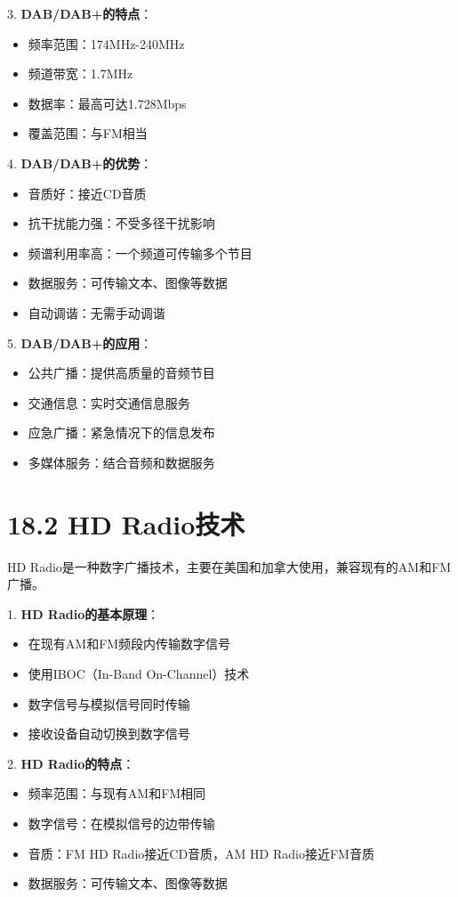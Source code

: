 \documentclass[12pt,UTF8]{ctexbook}
\begin{document}
3. \textbf{DAB/DAB+的特点}：
   \begin{itemize}[leftmargin=3.5em]
   \item 频率范围：174MHz-240MHz
   \item 频道带宽：1.7MHz
   \item 数据率：最高可达1.728Mbps
   \item 覆盖范围：与FM相当
   \end{itemize}

4. \textbf{DAB/DAB+的优势}：
   \begin{itemize}[leftmargin=3.5em]
   \item 音质好：接近CD音质
   \item 抗干扰能力强：不受多径干扰影响
   \item 频谱利用率高：一个频道可传输多个节目
   \item 数据服务：可传输文本、图像等数据
   \item 自动调谐：无需手动调谐
   \end{itemize}

5. \textbf{DAB/DAB+的应用}：
   \begin{itemize}[leftmargin=3.5em]
   \item 公共广播：提供高质量的音频节目
   \item 交通信息：实时交通信息服务
   \item 应急广播：紧急情况下的信息发布
   \item 多媒体服务：结合音频和数据服务
   \end{itemize}

\section*{18.2 HD Radio技术}

HD Radio是一种数字广播技术，主要在美国和加拿大使用，兼容现有的AM和FM广播。

1. \textbf{HD Radio的基本原理}：
   \begin{itemize}[leftmargin=3.5em]
   \item 在现有AM和FM频段内传输数字信号
   \item 使用IBOC（In-Band On-Channel）技术
   \item 数字信号与模拟信号同时传输
   \item 接收设备自动切换到数字信号
   \end{itemize}

2. \textbf{HD Radio的特点}：
   \begin{itemize}[leftmargin=3.5em]
   \item 频率范围：与现有AM和FM相同
   \item 数字信号：在模拟信号的边带传输
   \item 音质：FM HD Radio接近CD音质，AM HD Radio接近FM音质
   \item 数据服务：可传输文本、图像等数据
   \end{itemize}
\end{document}

